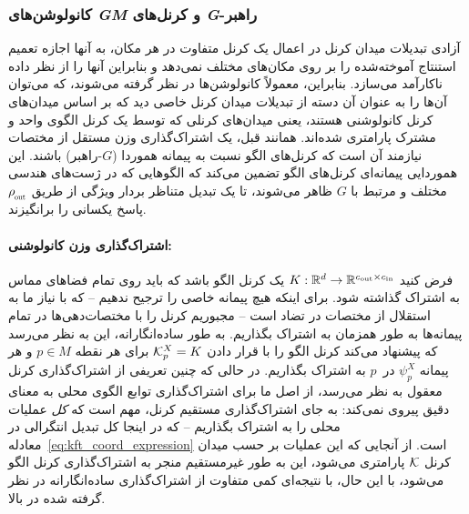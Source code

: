 \subsubsection{کانولوشن‌های \textit{GM} و کرنل‌های \textit{G}-راهبر}
\label{sec:gauge_conv}

آزادی تبدیلات میدان کرنل در اعمال یک کرنل متفاوت در هر مکان، به آنها اجازه تعمیم استنتاج آموخته‌شده را بر روی مکان‌های مختلف نمی‌دهد و بنابراین آنها را از نظر داده ناکارآمد می‌سازد.
بنابراین، معمولاً کانولوشن‌ها در نظر گرفته می‌شوند، که می‌توان آن‌ها را به عنوان آن دسته از تبدیلات میدان کرنل خاصی دید که بر اساس میدان‌های کرنل کانولوشنی هستند، یعنی میدان‌های کرنلی که توسط یک کرنل الگوی واحد و مشترک پارامتری شده‌اند.
همانند قبل، یک اشتراک‌گذاری وزن مستقل از مختصات نیازمند آن است که کرنل‌های الگو نسبت به پیمانه هموردا ($G$-راهبر) باشند.
این هموردایی پیمانه‌ای کرنل‌های الگو تضمین می‌کند که الگوهایی که در ژست‌های هندسی مختلف و مرتبط با $G$ ظاهر می‌شوند، تا یک تبدیل متناظر بردار ویژگی از طریق $\rhoout$ پاسخ یکسانی را برانگیزند.


\paragraph{اشتراک‌گذاری وزن کانولوشنی:}
فرض کنید $K: \mathbb{R}^d \to \mathbb{R}^{{c_\textup{out}}\times{c_\textup{in}}}$ یک کرنل الگو باشد که باید روی تمام فضاهای مماس به اشتراک گذاشته شود.
برای اینکه هیچ پیمانه خاصی را ترجیح ندهیم -- که با نیاز ما به استقلال از مختصات در تضاد است -- مجبوریم کرنل را با مختصات‌دهی‌ها در تمام پیمانه‌ها به طور همزمان به اشتراک بگذاریم.
به طور ساده‌انگارانه، این به نظر می‌رسد که پیشنهاد می‌کند کرنل الگو را با قرار دادن $\mathcal{K}_p^X = K$ برای هر نقطه $p\in M$ و هر پیمانه $\psi_p^X$ در~$p$ به اشتراک بگذاریم.
در حالی که چنین تعریفی از اشتراک‌گذاری کرنل معقول به نظر می‌رسد، از اصل ما برای اشتراک‌گذاری توابع الگوی محلی به معنای دقیق پیروی نمی‌کند:
به جای اشتراک‌گذاری مستقیم کرنل، مهم است که \emph{کل} عملیات محلی را به اشتراک بگذاریم -- که در اینجا کل
تبدیل انتگرالی در معادله~\eqref{eq:kft_coord_expression} است.
از آنجایی که این عملیات بر حسب میدان کرنل $\mathcal{K}$ پارامتری می‌شود، این به طور غیرمستقیم منجر به اشتراک‌گذاری کرنل الگو می‌شود، با این حال، با نتیجه‌ای کمی متفاوت از اشتراک‌گذاری ساده‌انگارانه در نظر گرفته شده در بالا.

